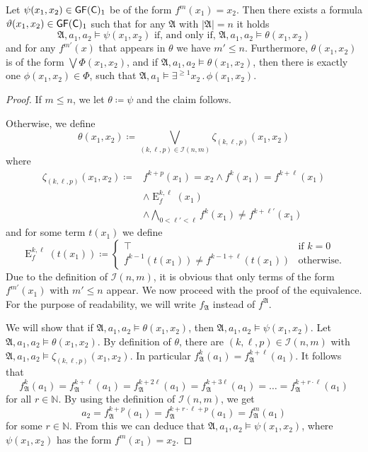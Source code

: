 \begin{lemma}
	Let $\psi(x_1,x_2)\in \mathsf{GF}(\mathsf{C})_1$ be of the form $f^m(x_1)=x_2$. 
	Then there exists a formula $\vartheta(x_1,x_2)\in \mathsf{GF}(\mathsf{C})_1$ such that for any $\mathfrak A$ with $\vert \mathfrak A\vert=n$ it holds
	$$\mathfrak A,a_1,a_2 \models \psi(x_1,x_2) \text{ if, and only if, } \mathfrak A,a_1,a_2 \models \theta(x_1,x_2)$$ 
	and for any $f^{m'}(x)$ that appears in $\theta$ we have $m'\leq n$.
	Furthermore, $\theta(x_1,x_2)$ is of the form $\bigvee \Phi(x_1,x_2)$, and if $\mathfrak A,a_1,a_2\models \theta(x_1,x_2)$, then there is exactly one $\phi(x_1,x_2)\in\Phi$, such that $\mathfrak A,a_1\models \exists^{\geq 1} x_2 \operatorname{.} \phi(x_1,x_2)$.
	\label{Simple_fm_to_fk}
\end{lemma}
\begin{proof}
	If $m \leq n$, we let $\theta\coloneqq\psi$ and the claim follows.
	
	Otherwise, we define
	$$\theta(x_1,x_2)\coloneqq \bigvee_{(k,\ell,p)\in \mathcal I(n,m)} \zeta_{(k,\ell,p)}(x_1,x_2)$$
	where
	\begin{align*}
		\zeta_{(k,\ell,p)}(x_1,x_2)\coloneqq & f^{k+p}(x_1)=x_2 \land f^{k}(x_1)=f^{k+\ell}(x_1) \\
		& \land \operatorname{E}^{k,\ell}_{f}(x_1)  \\
		& \land \bigwedge_{0<\ell'<\ell}f^{k}(x_1)\neq f^{k+\ell'}(x_1)
	\end{align*}
	and for some term $t(x_1)$ we define
	$$\operatorname{E}^{k,\ell}_{f}(t(x_1))\coloneqq\begin{cases}
		\top & \text{if } k=0 \\
		f^{k-1}(t(x_1))\neq f^{k-1+\ell}(t(x_1)) & \text{otherwise}.
	\end{cases}$$
	Due to the definition of $\mathcal I(n,m)$, it is obvious that only terms of the form $f^{m'}(x_1)$ with $m'\leq n$ appear.
	We now proceed with the proof of the equivalence.
	For the purpose of readability, we will write $f_{\mathfrak A}$ instead of $f^{\mathfrak A}$.
	
	We will show that if $\mathfrak A,a_1,a_2 \models \theta(x_1,x_2)$, then $\mathfrak A,a_1,a_2 \models \psi(x_1,x_2)$.
	Let $\mathfrak A,a_1,a_2 \models \theta(x_1,x_2)$. 
	By definition of $\theta$, there are $(k,\ell,p)\in \mathcal I(n,m)$ with $\mathfrak A,a_1,a_2 \models \zeta_{(k,\ell,p)}(x_1,x_2)$.
	In particular $f_{\mathfrak A}^{k}(a_1)=f_{\mathfrak A}^{k+\ell}(a_1)$. It follows that
	$$f_{\mathfrak A}^{k}(a_1)=f_{\mathfrak A}^{k+\ell}(a_1)=f_{\mathfrak A}^{k+2\ell}(a_1)=f_{\mathfrak A}^{k+3\ell}(a_1) = \dots = f_{\mathfrak A}^{k+r\cdot \ell}(a_1)$$
	for all $r\in \mathbb N$. By using the definition of $\mathcal{I}(n,m)$, we get
	$$a_2 =f_{\mathfrak A}^{k+p}(a_1) = f_{\mathfrak A}^{k+r\cdot \ell + p}(a_1)=f_{\mathfrak A}^{m}(a_1)$$
	for some $r\in \mathbb N$.
	From this we can deduce that $\mathfrak A,a_1,a_2\models \psi(x_1,x_2)$, where $\psi(x_1,x_2)$ has the form $f^{m}(x_1)=x_2$.
	

\end{proof}
